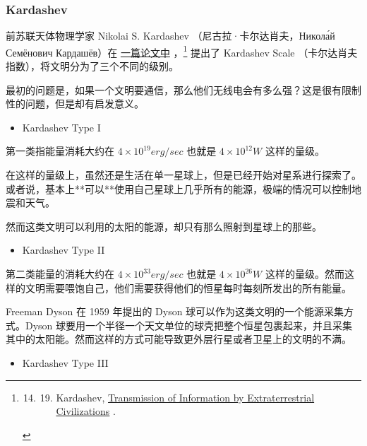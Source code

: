 \documentclass[letterpaper,10pt,english]{sphinxmanual}
\begin{document}
\subsubsection{Kardashev}
\label{fermi:kardashev}
前苏联天体物理学家 Nikolai S. Kardashev （尼古拉·卡尔达肖夫，Никола́й Семёнович Кардашёв）在 \href{http://adsabs.harvard.edu/cgi-bin/nph-bib\_query?bibcode=1964SvA.....8..217K\&db\_key=AST}{一篇论文中} ，\footnote{\begin{enumerate}
\setcounter{enumi}{13}
\item {} \begin{enumerate}
\setcounter{enumi}{18}
\item {} 
Kardashev, \href{http://adsabs.harvard.edu/cgi-bin/nph-bib\_query?bibcode=1964SvA.....8..217K\&db\_key=AST}{Transmission of Information by Extraterrestrial Civilizations} .

\end{enumerate}

\end{enumerate}
} 提出了 Kardashev Scale （卡尔达肖夫指数），将文明分为了三个不同的级别。

最初的问题是，如果一个文明要通信，那么他们无线电会有多么强？这是很有限制性的问题，但是却有启发意义。
\begin{itemize}
\item {} 
Kardashev Type I

\end{itemize}

第一类指能量消耗大约在 \(4\times 10^{19}erg/sec\) 也就是 \(4\times 10^{12} W\) 这样的量级。

在这样的量级上，虽然还是生活在单一星球上，但是已经开始对星系进行探索了。或者说，基本上**可以**使用自己星球上几乎所有的能源，极端的情况可以控制地震和天气。

然而这类文明可以利用的太阳的能源，却只有那么照射到星球上的那些。
\begin{itemize}
\item {} 
Kardashev Type II

\end{itemize}

第二类能量的消耗大约在 \(4\times 10^{33} erg/sec\) 也就是 \(4×10^{26} W\) 这样的量级。然而这样的文明需要喂饱自己，他们需要获得他们的恒星每时每刻所发出的所有能量。

Freeman Dyson 在 1959 年提出的 Dyson 球可以作为这类文明的一个能源采集方式。Dyson 球要用一个半径一个天文单位的球壳把整个恒星包裹起来，并且采集其中的太阳能。然而这样的方式可能导致更外层行星或者卫星上的文明的不满。
\begin{itemize}
\item {} 
Kardashev Type III

\end{itemize}
\end{document}
